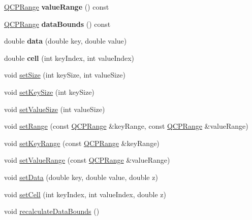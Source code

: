 \begin{DoxyCompactItemize}
\mbox{\hyperlink{class_q_c_p_range}{Q\+C\+P\+Range}} {\bfseries value\+Range} () const
\item 
\mbox{\label{class_q_c_p_color_map_data_ab7620248272c5ddd9a3f877f07179f6d}} 
\mbox{\hyperlink{class_q_c_p_range}{Q\+C\+P\+Range}} {\bfseries data\+Bounds} () const
\item 
\mbox{\label{class_q_c_p_color_map_data_a2c33807b008cdb9e1394245c294c0eaf}} 
double {\bfseries data} (double key, double value)
\item 
\mbox{\label{class_q_c_p_color_map_data_af51ecd21f347adbf87b4cce4e1f5cbd6}} 
double {\bfseries cell} (int key\+Index, int value\+Index)
\item 
void \mbox{\hyperlink{class_q_c_p_color_map_data_a0d9ff35c299d0478b682bfbcdd9c097e}{set\+Size}} (int key\+Size, int value\+Size)
\item 
void \mbox{\hyperlink{class_q_c_p_color_map_data_ac7ef70e383aface34b44dbde49234b6b}{set\+Key\+Size}} (int key\+Size)
\item 
void \mbox{\hyperlink{class_q_c_p_color_map_data_a0893c9e3914513048b45e3429ffd16f2}{set\+Value\+Size}} (int value\+Size)
\item 
void \mbox{\hyperlink{class_q_c_p_color_map_data_aad9c1c7c703c1339489fc730517c83d4}{set\+Range}} (const \mbox{\hyperlink{class_q_c_p_range}{Q\+C\+P\+Range}} \&key\+Range, const \mbox{\hyperlink{class_q_c_p_range}{Q\+C\+P\+Range}} \&value\+Range)
\item 
void \mbox{\hyperlink{class_q_c_p_color_map_data_a0738c485f3c9df9ea1241b7a8bb6a86e}{set\+Key\+Range}} (const \mbox{\hyperlink{class_q_c_p_range}{Q\+C\+P\+Range}} \&key\+Range)
\item 
void \mbox{\hyperlink{class_q_c_p_color_map_data_ada1b2680ba96a5f4175b6d341cf75d23}{set\+Value\+Range}} (const \mbox{\hyperlink{class_q_c_p_range}{Q\+C\+P\+Range}} \&value\+Range)
\item 
void \mbox{\hyperlink{class_q_c_p_color_map_data_afd2083ccfd6987ec94aa7ef8e91ca39a}{set\+Data}} (double key, double value, double z)
\item 
void \mbox{\hyperlink{class_q_c_p_color_map_data_a8e75eaf8746596319032a93f3d2d0683}{set\+Cell}} (int key\+Index, int value\+Index, double z)
\item 
void \mbox{\hyperlink{class_q_c_p_color_map_data_ab235ade8a4d64bd3adb26a99b3dd57ee}{recalculate\+Data\+Bounds}} ()

\end{DoxyCompactItemize}
